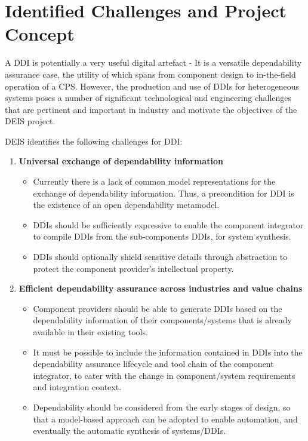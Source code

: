 \section{Identified Challenges and Project Concept}
A DDI is potentially a very useful digital artefact - It is a versatile dependability assurance case, the utility of which spans from component design to in-the-field operation of a CPS. However, the production and use of DDIs for heterogeneous systems poses a number of significant technological and engineering challenges that are pertinent and important in industry and motivate the objectives of the DEIS project. 

DEIS identifies the following challenges for DDI:

\begin{enumerate}
	\item \textbf{Universal exchange of dependability information}
		\begin{itemize}
			\item Currently there is a lack of common model representations for the exchange of dependability information. Thus, a precondition for DDI is the existence of an open dependability metamodel. 
			\item DDIs should be sufficiently expressive to enable the component integrator to compile DDIs from the sub-components DDIs, for system synthesis.
			\item DDIs should optionally shield sensitive details through abstraction to protect the component provider's intellectual property. 
		\end{itemize}
	\item \textbf{Efficient dependability assurance across industries and value chains}
		\begin{itemize}
			\item Component providers should be able to generate DDIs based on the dependability information of their components/systems that is already available in their existing tools.
			\item It must be possible to include the information contained in DDIs into the dependability assurance lifecycle and tool chain of the component integrator, to cater with the change in component/system requirements and integration context.
			\item Dependability should be considered from the early stages of design, so that a model-based approach can be adopted to enable automation, and eventually the automatic synthesis of systems/DDIs.
		\end{itemize}

\end{enumerate}
